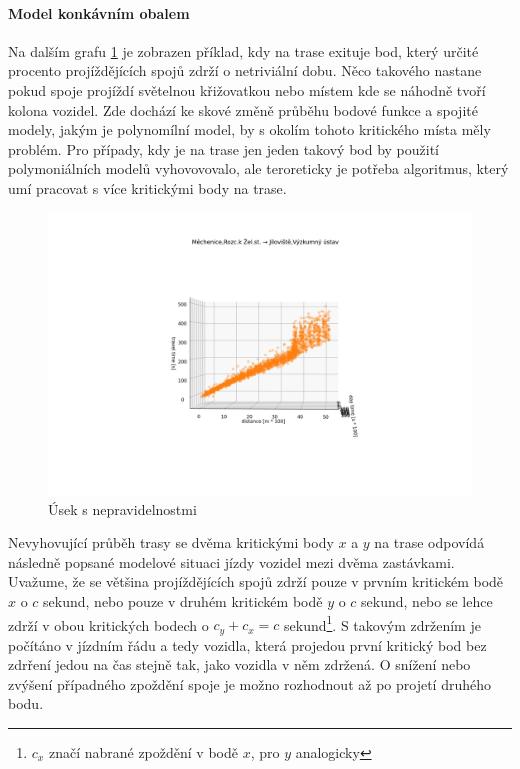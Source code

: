 \paragraph{Model konkávním obalem}

Na dalším grafu \ref{fig:nepredvidatelne_zdrzeni} je zobrazen příklad, kdy na trase exituje bod, který určité procento projíždějících spojů zdrží o netriviální dobu. Něco takového nastane pokud spoje projíždí světelnou křižovatkou nebo místem kde se náhodně tvoří kolona vozidel. Zde dochází ke skové změně průběhu bodové funkce a spojité modely, jakým je polynomílní model, by s okolím tohoto kritického místa měly problém. Pro případy, kdy je na trase jen jeden takový bod by použití polymoniálních modelů vyhovovovalo, ale teroreticky je potřeba algoritmus, který umí pracovat s více kritickými body na trase.

\begin{figure}
	\centering
  \includegraphics[width=\linewidth]{../img/nepredvidatelne_zdrzeni.png}
  \caption{Úsek s nepravidelnostmi}
  \label{fig:nepredvidatelne_zdrzeni}
\end{figure}

Nevyhovující průběh trasy se dvěma kritickými body $x$ a $y$ na trase odpovídá následně popsané modelové situaci jízdy vozidel mezi dvěma zastávkami. Uvažume, že se většina projíždějících spojů zdrží pouze v prvním kritickém bodě $x$ o $c$ sekund, nebo pouze v druhém kritickém bodě $y$ o $c$ sekund, nebo se lehce zdrží v obou kritických bodech o $c_y + c_x = c$ sekund\footnote{$c_x$ značí nabrané zpoždění v bodě $x$, pro $y$ analogicky}. S takovým zdržením je počítáno v jízdním řádu a tedy vozidla, která projedou první kritický bod bez zdrření jedou na čas stejně tak, jako vozidla v něm zdržená. O snížení nebo zvýšení případného zpoždění spoje je možno rozhodnout až po projetí druhého bodu.

